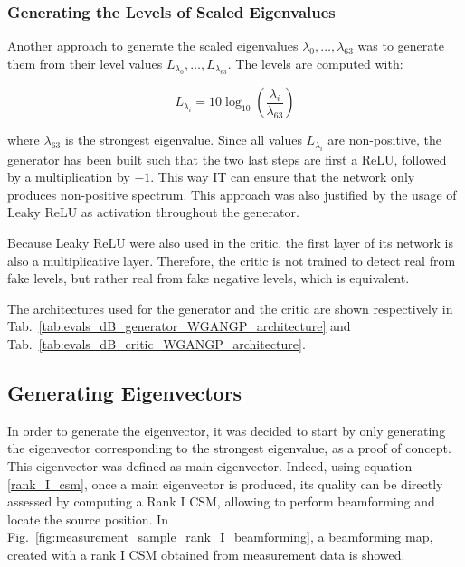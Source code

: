 \documentclass[11pt,a4paper,twoside]{report}
\begin{document}
\subsubsection{Generating the Levels of Scaled Eigenvalues}

Another approach to generate the scaled eigenvalues $\lambda_0, \dots, \lambda_{63}$ was to generate them from their level values $ L_{\lambda_0} , \dots,  L_{\lambda_{63}} $. The levels are computed with:

\begin{equation}
    L_{\lambda_i} = 10 \log_{10}(\frac{\lambda_i}{\lambda_{63}})
\end{equation}

where $\lambda_{63}$ is the strongest eigenvalue.  Since all values $L_{\lambda_i}$ are non-positive, the generator has been built such that the two last steps are first a ReLU, followed by a multiplication by $-1$. This way IT can ensure that the network only produces non-positive spectrum. This approach was also justified by the usage of Leaky ReLU as activation throughout the generator. 

Because Leaky ReLU were also used in the critic, the first layer of its network is also a multiplicative layer. Therefore, the critic is not trained to detect real from fake levels, but rather real from fake negative levels, which is equivalent. 

The architectures used for the generator and the critic are shown respectively in Tab.~\ref{tab:evals_dB_generator_WGANGP_architecture} and Tab.~\ref{tab:evals_dB_critic_WGANGP_architecture}.


\subsection{Generating Eigenvectors}

In order to generate the eigenvector, it was decided to start by only generating the eigenvector corresponding to the strongest eigenvalue, as a proof of concept. This eigenvector was defined as main eigenvector. Indeed, using equation \ref{rank_I_csm}, once a main eigenvector is produced, its quality can be directly assessed by computing a Rank I CSM, allowing to perform beamforming and locate the source position. In Fig.~\ref{fig:measurement_sample_rank_I_beamforming}, a beamforming map, created with a rank I CSM obtained from measurement data is showed.
\end{document}
